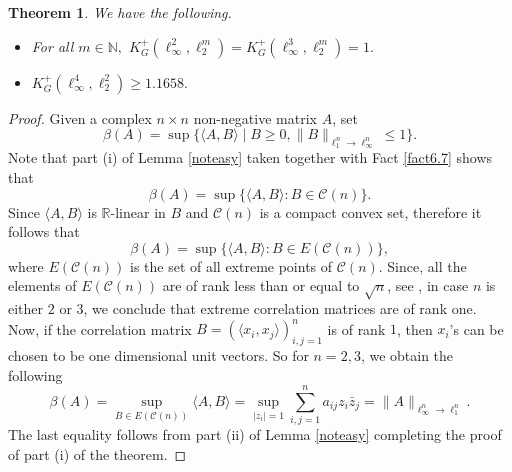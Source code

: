 \documentclass[a4paper,oneside,11pt, reqno]{amsart}
\numberwithin{equation}{section}
\newtheorem{theorem}{Theorem}[section]
\theoremstyle{plain}
\begin{document}
\begin{theorem}\label{plasth}
We have the following.
\begin{itemize}
    \item[(i)] For all $m\in\mathbb N,$ $K_G^{+}(\ell_\infty^2,\ell_2^m)=K_G^{+}(\ell_\infty^3,\ell_2^m)=1.$
    \item[(ii)] $K_G^{+}(\ell_\infty^4,\ell_2^2)\geqslant 1.1658.$
\end{itemize}
 \end{theorem}
\begin{proof}

Given a complex $n\times n$ non-negative matrix $A$, set  
\[\beta(A)=\sup\big\{ \langle A,B\rangle\mid B\geqslant 0, \|B\|_{\ell_1^n\to\ell_\infty^n}\leqslant 1 \big \}.\] 
Note that part (i) of Lemma \ref{noteasy} taken together with Fact \ref{fact6.7} shows that 
\[\beta(A)=\sup\{\langle A,B\rangle: B\in\mathcal{C}(n)\}.\] 
Since $\langle A,B\rangle$ is $\mathbb R$-linear in $B$ and $\mathcal{C}(n)$ is a compact convex set, therefore it follows that 
\[\beta(A)=\sup\{\langle A,B\rangle: B\in E(\mathcal{C}(n))\},\] 
where $E(\mathcal{C}(n))$ is the set of all extreme points of $\mathcal{C}(n)$. Since, all the elements of $E(\mathcal{C}(n))$ are of rank less than or equal to $\sqrt{n}$, see \cite{LCB}, in case $n$ is either $2$ or $3$, we conclude that extreme correlation matrices are of rank one. Now, if the correlation matrix $B=(\langle x_i,x_j\rangle)_{i,j=1}^n$ is of rank $1$, then $x_i$'s can be chosen to be one dimensional unit vectors. So for $n=2,3$, we obtain the following \[\beta(A)=\sup_{B\in E(\mathcal{C}(n))}\langle A,B\rangle=\sup_{\mid z_i\mid=1}\sum_{i,j=1}^{n}a_{ij}z_i\bar{z}_{j}=\|{A} \|_{\ell_\infty^n\to\ell_1^n}.\] The last equality follows from part (ii) of Lemma \ref{noteasy}
completing the proof of part (i) of the theorem.


\end{proof}
\end{document}
